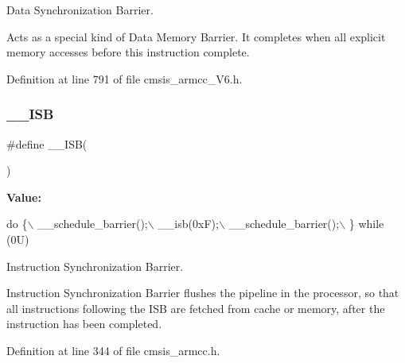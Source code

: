 Data Synchronization Barrier. 

Acts as a special kind of Data Memory Barrier. It completes when all explicit memory accesses before this instruction complete. 

Definition at line 791 of file cmsis\+\_\+armcc\+\_\+\+V6.\+h.

\mbox{\label{group___c_m_s_i_s___core___instruction_interface_gaad233022e850a009fc6f7602be1182f6}} 
\subsubsection{\texorpdfstring{\+\_\+\+\_\+\+I\+SB}{\_\_ISB}\hspace{0.1cm}{\footnotesize\ttfamily [1/2]}}
{\footnotesize\ttfamily \#define \+\_\+\+\_\+\+I\+SB(\begin{DoxyParamCaption}{ }\end{DoxyParamCaption})}

{\bfseries Value\+:}
\begin{DoxyCode}
\textcolor{keywordflow}{do} \{\(\backslash\)
                   \_\_schedule\_barrier();\(\backslash\)
                   \_\_isb(0xF);\(\backslash\)
                   \_\_schedule\_barrier();\(\backslash\)
                \} \textcolor{keywordflow}{while} (0U)
\end{DoxyCode}


Instruction Synchronization Barrier. 

Instruction Synchronization Barrier flushes the pipeline in the processor, so that all instructions following the I\+SB are fetched from cache or memory, after the instruction has been completed. 

Definition at line 344 of file cmsis\+\_\+armcc.\+h.

\mbox{\label{group___c_m_s_i_s___core___instruction_interface_gaad233022e850a009fc6f7602be1182f6}} 
